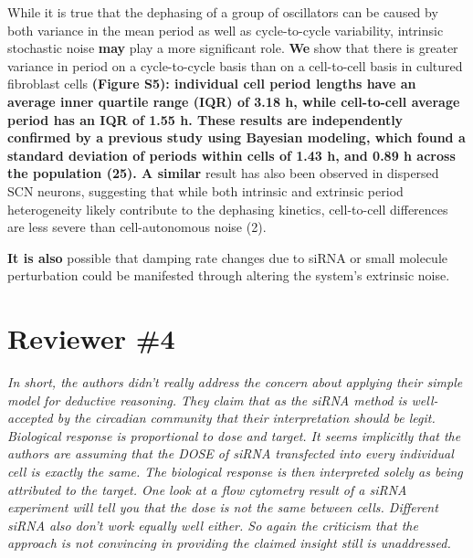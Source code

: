 \documentclass[11pt, letterpaper]{article}
\newenvironment{reviewer}{\itshape\color{gray}}{}
\newenvironment{manuscript}[1]{\begin{center}\begin{tcolorbox}[colback=green!5!white,colframe=green!75!black,width=\textwidth,title={#1},breakable,fonttitle=\bfseries]}{\end{tcolorbox}\end{center}}
\begin{document}
\begin{manuscript}{Page 6}
  While it is true that the dephasing of a group of oscillators can be caused by both variance in the mean period as well as cycle-to-cycle variability, intrinsic stochastic noise {\bf may} play a more significant role. 
{\bf We} show that there is greater variance in period on a cycle-to-cycle basis than on a cell-to-cell basis in cultured fibroblast cells {\bf (Figure S5): individual cell period lengths have an average inner quartile range (IQR) of 3.18 h, while cell-to-cell average period has an IQR of 1.55 h. 
These results are independently confirmed by a previous study using Bayesian modeling, which found a standard deviation of periods within cells of 1.43 h, and 0.89 h across the population (25). 
A similar} result has also been observed in dispersed SCN neurons, suggesting that while both intrinsic and extrinsic period heterogeneity likely contribute to the dephasing kinetics, cell-to-cell differences are less severe than cell-autonomous noise (2).

{\bf It is also} possible that damping rate changes due to siRNA or small molecule perturbation could be manifested through altering the system's extrinsic noise.

\end{manuscript}

\section*{Reviewer \#4}

\begin{reviewer}
In short, the authors didn't really address the concern about applying their simple model for deductive reasoning. They claim that as the siRNA method is well-accepted by the circadian community that their interpretation should be legit. Biological response is proportional to dose and target. It seems implicitly that the authors are assuming that the DOSE of siRNA transfected into every individual cell is exactly the same. The biological response is then interpreted solely as being attributed to the target. One look at a flow cytometry result of a siRNA experiment will tell you that the dose is not the same between cells. Different siRNA also don't work equally well either. So again the criticism that the approach is not convincing in providing the claimed insight still is unaddressed.
\end{reviewer}
\end{document}
